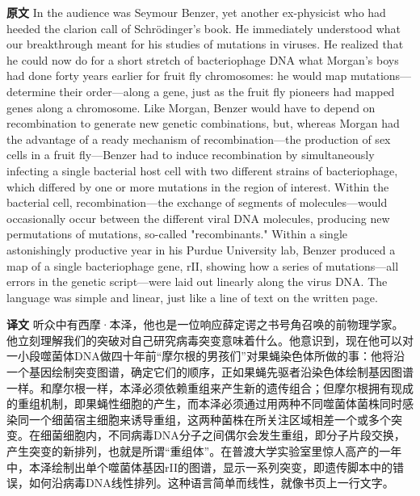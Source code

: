 \documentclass[UTF8,zihao=-4]{ctexart}
\newcommand{\BodyFont}{\fontsize{10.5pt}{15.5pt}\selectfont}
\renewenvironment{quote}{\par\noindent\begingroup\BodyFont}{\par\endgroup}
\begin{document}
\begin{quote}
\noindent\textbf{原文} In the audience was Seymour Benzer, yet another ex-physicist who had heeded the clarion call of Schrödinger's book. He immediately understood what our breakthrough meant for his studies of mutations in viruses. He realized that he could now do for a short stretch of bacteriophage DNA what Morgan's boys had done forty years earlier for fruit fly chromosomes: he would map mutations---determine their order---along a gene, just as the fruit fly pioneers had mapped genes along a chromosome. Like Morgan, Benzer would have to depend on recombination to generate new genetic combinations, but, whereas Morgan had the advantage of a ready mechanism of recombination---the production of sex cells in a fruit fly---Benzer had to induce recombination by simultaneously infecting a single bacterial host cell with two different strains of bacteriophage, which differed by one or more mutations in the region of interest. Within the bacterial cell, recombination---the exchange of segments of molecules---would occasionally occur between the different viral DNA molecules, producing new permutations of mutations, so-called "recombinants." Within a single astonishingly productive year in his Purdue University lab, Benzer produced a map of a single bacteriophage gene, rII, showing how a series of mutations---all errors in the genetic script---were laid out linearly along the virus DNA. The language was simple and linear, just like a line of text on the written page.

\smallskip
\noindent\textbf{译文} 听众中有西摩·本泽，他也是一位响应薛定谔之书号角召唤的前物理学家。他立刻理解我们的突破对自己研究病毒突变意味着什么。他意识到，现在他可以对一小段噬菌体DNA做四十年前“摩尔根的男孩们”对果蝇染色体所做的事：他将沿一个基因绘制突变图谱，确定它们的顺序，正如果蝇先驱者沿染色体绘制基因图谱一样。和摩尔根一样，本泽必须依赖重组来产生新的遗传组合；但摩尔根拥有现成的重组机制，即果蝇性细胞的产生，而本泽必须通过用两种不同噬菌体菌株同时感染同一个细菌宿主细胞来诱导重组，这两种菌株在所关注区域相差一个或多个突变。在细菌细胞内，不同病毒DNA分子之间偶尔会发生重组，即分子片段交换，产生突变的新排列，也就是所谓“重组体”。在普渡大学实验室里惊人高产的一年中，本泽绘制出单个噬菌体基因rII的图谱，显示一系列突变，即遗传脚本中的错误，如何沿病毒DNA线性排列。这种语言简单而线性，就像书页上一行文字。
\end{quote}
\end{document}
